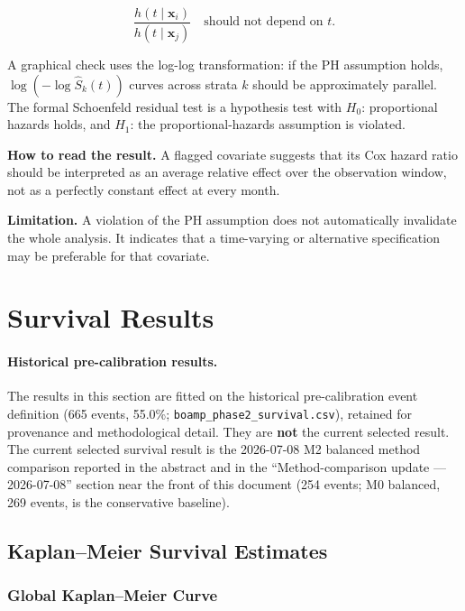 \documentclass[12pt, a4paper]{article}
\begin{document}
\begin{equation}
  \frac{h(t \mid \mathbf{x}_i)}{h(t \mid \mathbf{x}_j)}
  \quad \text{should not depend on } t.
\end{equation}

A graphical check uses the log-log transformation: if the PH assumption holds,
$\log(-\log\hat{S}_k(t))$ curves across strata $k$ should be approximately
parallel. The formal Schoenfeld residual test is a hypothesis test with
$H_0$: proportional hazards holds, and $H_1$: the proportional-hazards
assumption is violated.

\textbf{How to read the result.} A flagged covariate suggests that its Cox
hazard ratio should be interpreted as an average relative effect over the
observation window, not as a perfectly constant effect at every month.

\textbf{Limitation.} A violation of the PH assumption does not automatically
invalidate the whole analysis. It indicates that a time-varying or alternative
specification may be preferable for that covariate.

\section{Survival Results}

\paragraph{Historical pre-calibration results.} The results in this section are
fitted on the historical pre-calibration event definition (665 events, 55.0\%;
\texttt{boamp\_phase2\_survival.csv}), retained for provenance and
methodological detail. They are \textbf{not} the current selected result. The
current selected survival result is the 2026-07-08 M2 balanced method
comparison reported in the abstract and in the ``Method-comparison update ---
2026-07-08'' section near the front of this document (254 events; M0 balanced,
269 events, is the conservative baseline).

\subsection{Kaplan--Meier Survival Estimates}

\subsubsection*{Global Kaplan--Meier Curve}
\end{document}
